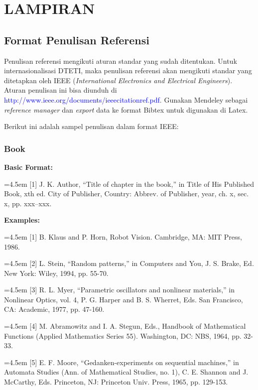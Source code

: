 \chapter*{LAMPIRAN}

\section{Format Penulisan Referensi}

Penulisan referensi mengikuti aturan standar yang sudah ditentukan. Untuk 
internasionalisasi DTETI, maka penulisan referensi akan mengikuti standar yang 
ditetapkan oleh IEEE (\textit{International Electronics and Electrical Engineers}). Aturan penulisan ini bisa diunduh di \textcolor{blue}{http://www.ieee.org/documents/ieeecitationref.pdf}. Gunakan Mendeley sebagai \textit{reference manager} dan \textit{export} data ke format Bibtex untuk digunakan di Latex.

Berikut ini adalah sampel penulisan dalam format IEEE:

\subsection{Book}

\textbf{Basic Format:}

\hangindent=4.5em
[1] J. K. Author, “Title of chapter in the book,” in Title of His Published Book, xth ed. City of Publisher, Country: Abbrev. of Publisher, year, ch. x, sec. x, pp. xxx–xxx.

\textbf{Examples:}

\hangindent=4.5em 
[1] B. Klaus and P. Horn, Robot Vision. Cambridge, MA: MIT Press, 1986.

\hangindent=4.5em 
[2] L. Stein, “Random patterns,” in Computers and You, J. S. Brake, Ed. New York: Wiley, 1994, pp. 55-70.

\hangindent=4.5em 
[3] R. L. Myer, “Parametric oscillators and nonlinear materials,” in Nonlinear Optics, vol. 4, P. G. Harper and B. S. Wherret, Eds. San Francisco, CA: Academic, 1977, pp. 47-160.

\hangindent=4.5em 
[4] M. Abramowitz and I. A. Stegun, Eds., Handbook of Mathematical Functions (Applied Mathematics Series 55). Washington, DC: NBS, 1964, pp. 32-33.

\hangindent=4.5em 
[5] E. F. Moore, “Gedanken-experiments on sequential machines,” in Automata Studies 
(Ann. of Mathematical Studies, no. 1), C. E. Shannon and J. McCarthy, Eds. Princeton, NJ: Princeton Univ. Press, 1965, pp. 129-153.

